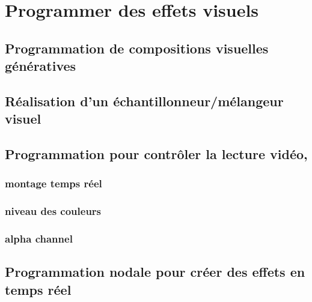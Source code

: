 \documentclass[
]{book}
\begin{document}
\hypertarget{programmer}{%
\chapter{Programmer des effets visuels}\label{programmer}}

\hypertarget{programmation-de-compositions-visuelles-guxe9nuxe9ratives}{%
\section{Programmation de compositions visuelles génératives}\label{programmation-de-compositions-visuelles-guxe9nuxe9ratives}}

\hypertarget{ruxe9alisation-dun-uxe9chantillonneurmuxe9langeur-visuel}{%
\section{Réalisation d'un échantillonneur/mélangeur visuel}\label{ruxe9alisation-dun-uxe9chantillonneurmuxe9langeur-visuel}}

\hypertarget{programmation-pour-contruxf4ler-la-lecture-viduxe9o}{%
\section{Programmation pour contrôler la lecture vidéo,}\label{programmation-pour-contruxf4ler-la-lecture-viduxe9o}}

\hypertarget{montage-temps-ruxe9el}{%
\subsection{montage temps réel}\label{montage-temps-ruxe9el}}

\hypertarget{niveau-des-couleurs}{%
\subsection{niveau des couleurs}\label{niveau-des-couleurs}}

\hypertarget{alpha-channel-1}{%
\subsection{alpha channel}\label{alpha-channel-1}}

\hypertarget{programmation-nodale-pour-cruxe9er-des-effets-en-temps-ruxe9el}{%
\section{Programmation nodale pour créer des effets en temps réel}\label{programmation-nodale-pour-cruxe9er-des-effets-en-temps-ruxe9el}}
\end{document}
